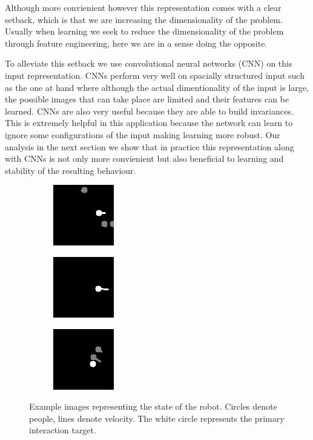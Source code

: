 \documentclass[letterpaper, 10 pt, conference]{ieeeconf}
\begin{document}
Although more convienient however this representation comes with a clear setback, which is that we are increasing the dimensionality of the problem. Usually when learning we seek to reduce the dimensionality of the problem through feature engineering, here we are in a sense doing the opposite. 

To alleviate this setback we use convolutional neural networks (CNN) on this input representation. CNNs perform very well on spacially structured input such as the one at hand where although the actual dimentionality of the input is large, the possible images that can take place are limited and their features can be learned. CNNs are also very useful because they are able to build invariances. This is extremely helpful in this application because the network can learn to ignore some configurations of the input making learning more robust. Our analysis in the next section we show that in practice this representation along with CNNs is not only more convienient but also beneficial to learning and stability of the resulting behaviour.

  	\begin{figure}[tbh]
  	\centering
      \begin{subfigure}[b]{0.30\columnwidth}
    \includegraphics[scale = 0.80]{images/state1.png}
    \label{fig:state1}
  \end{subfigure}
  \begin{subfigure}[b]{0.30\columnwidth}
    \includegraphics[scale = 0.80]{images/state2.png}
       \label{fig:state2}
  \end{subfigure} 
    \begin{subfigure}[b]{0.30\columnwidth}
    \includegraphics[scale = 0.80]{images/state3.png}
       \label{fig:state3}
  \end{subfigure}
  \caption{Example images representing the state of the robot. Circles denote people, lines denote velocity. The white circle represents the primary interaction target.}

    \vspace{-2mm}
  \label{fig:state}
  \end{figure}
\end{document}
